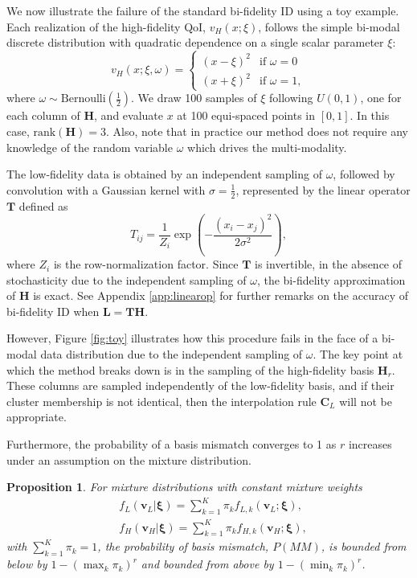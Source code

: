 \documentclass[preprint,10pt]{elsarticle}
\newtheorem{proposition}{Proposition}
\begin{document}
We now illustrate the failure of the standard bi-fidelity ID using a toy example. Each realization of the high-fidelity QoI, $v_H(x; \xi)$, follows the simple bi-modal discrete distribution with quadratic dependence on a single scalar parameter $\xi$:
%
\begin{equation}
v_H(x; \xi, \omega) = 
\begin{cases}
(x - \xi)^2 & \text{if } \omega = 0 \\
(x + \xi)^2 & \text{if } \omega = 1,
\end{cases}
\label{eq:toy}
\end{equation}
%
where \( \omega \sim \text{Bernoulli}(\frac{1}{2}) \). We draw 100 samples of $\xi$ following $U(0, 1)$, one for each column of $\bm H$, and evaluate $x$ at 100 equi-spaced points in $[0,1]$. In this case, $\mathrm{rank}(\bm H) = 3$. Also, note that in practice our method does not require any knowledge of the random variable $\omega$ which drives the multi-modality.

The low-fidelity data is obtained by an independent sampling of $\omega$, followed by convolution with a Gaussian kernel with $\sigma=\frac{1}{2}$, represented by the linear operator $\bm T$ defined as
%
\begin{equation}
\label{eq:T}
    T_{ij} = \frac{1}{Z_i} \exp\left( -\frac{(x_i - x_j)^2}{2 \sigma^2} \right),
\end{equation}
%
where $Z_i$ is the row-normalization factor.
Since $\bm T$ is invertible, in the absence of stochasticity due to the independent sampling of $\omega$, the bi-fidelity approximation of $\bm H$ is exact. See Appendix \ref{app:linearop} for further remarks on the accuracy of bi-fidelity ID when $\bm L=\bm T \bm H$. 

However, Figure \ref{fig:toy} illustrates how this procedure fails in the face of a bi-modal data distribution due to the independent sampling of $\omega$. The key point at which the method breaks down is in the sampling of the high-fidelity basis $\bm H_r$. These columns are sampled independently of the low-fidelity basis, and if their cluster membership is not identical, then the interpolation rule $\bm C_L$ will not be appropriate.  

Furthermore, the probability of a basis mismatch converges to 1 as $r$ increases under an assumption on the mixture distribution.

\begin{proposition}
For mixture distributions with constant mixture weights 
\begin{align}
    & f_L(\bm v_L | \bm \xi) = \sum_{k=1}^K \pi_k f_{L,k}(\bm v_L; \bm \xi), \\
    & f_H(\bm v_H | \bm \xi) = \sum_{k=1}^K \pi_k f_{H,k}(\bm v_H; \bm \xi),
\end{align}
with $\sum_{k=1}^K\pi_k=1$, the probability of basis mismatch, $P(MM)$, is bounded from below by $1 - (\max_k \pi_k)^r$ and bounded from above by $1 - (\min_k \pi_k)^r$.
\end{proposition}
\end{document}
